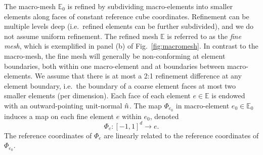 The macro-mesh $\mathbb{E}_0$ is refined by subdividing macro-elements
into smaller elements along faces of constant reference cube
  coordinates. Refinement can be multiple levels deep (i.e.\ refined
elements can be further subdivided), and we do not assume uniform
refinement.  The refined mesh $\mathbb{E}$ is referred to as the
\emph{fine mesh}, which is exemplified in panel (b) of
Fig.~\ref{fig:macromesh}.  In contrast to the macro-mesh, the fine
mesh will generally be non-conforming at element boundaries, both
within one macro-element and at boundaries between macro-elements. We
assume that there is at most a 2:1 refinement difference at any element
boundary, i.e.\ the boundary of a coarse element faces at most two
smaller elements (per dimension). Each face of each element $e\in
\mathbb{E}$ is endowed with an outward-pointing unit-normal $\Hat n$.
The map $\Phi_{e_0}$ in macro-element $e_0\in \mathbb{E}_0$
  induces a map on each fine element $e$ within $e_0$, denoted
\begin{equation}\label{eq:Phi_e}
\Phi_e: [-1,1]^d\to e.
\end{equation}
The reference coordinates of $\Phi_e$ are
linearly related to the reference coordinates of $\Phi_{e_0}$.

